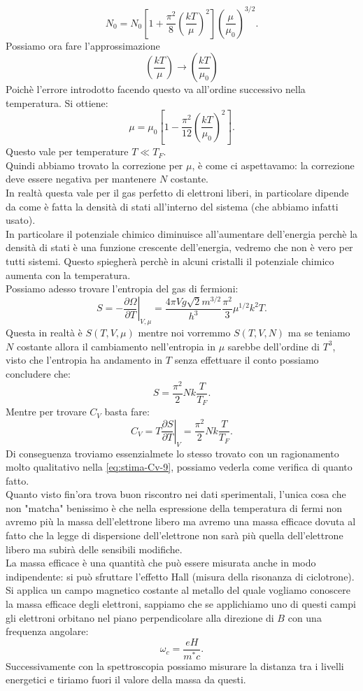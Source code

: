 \[
	N_0 = N_0\left[ 1 + \frac{\pi^2}{8}\left( \frac{kT}{\mu } \right) ^2 \right] \left( \frac{\mu }{\mu_0} \right) ^{3 /2}
.\] 
Possiamo ora fare l'approssimazione 
\[
\left( \frac{kT}{\mu } \right)  \to \left( \frac{kT}{\mu_0} \right) 
\]
Poichè l'errore introdotto facendo questo va all'ordine successivo nella temperatura. Si ottiene:
\[
	\mu = \mu_0\left[ 1- \frac{\pi^2}{12}\left( \frac{kT}{\mu_0} \right)^2 \right] 
.\] 
Questo vale per temperature $T \ll T_{F}$.\\
Quindi abbiamo trovato la correzione per $\mu $, è come ci aspettavamo: la correzione deve essere negativa per mantenere $N$ costante. \\
In realtà questa vale per il gas perfetto di elettroni liberi, in particolare dipende da come è fatta la densità di stati all'interno del sistema (che abbiamo infatti usato).\\
In particolare il potenziale chimico diminuisce all'aumentare dell'energia perchè la densità di stati è una funzione crescente dell'energia, vedremo che non è vero per tutti sistemi. Questo spiegherà perchè in alcuni cristalli il potenziale chimico aumenta con la temperatura.\\
Possiamo adesso trovare l'entropia del gas di fermioni:
\[
	S = - \left.\frac{\partial \Omega }{\partial T} \right|_{V,\mu } = 
		\frac{4\pi V g \sqrt{2} m ^{3 /2}}{h^3} \frac{\pi^2}{3}\mu ^{1 /2} k^2 T
.\] 
Questa in realtà è $S( T, V , \mu ) $ mentre noi vorremmo $S( T,V,N) $ ma se teniamo $N$ costante allora il cambiamento nell'entropia in $\mu $ sarebbe dell'ordine di $T^3$, visto che l'entropia ha andamento in $T$ senza effettuare il conto possiamo concludere che:
\[
	S = \frac{\pi^2}{2}Nk \frac{T}{T_{F}}
.\] 
Mentre per trovare $C_{V}$ basta fare:
\[
	C_{V} = T \left.\frac{\partial S}{\partial T} \right|_{V} = \frac{\pi^2}{2} Nk \frac{T}{T_{F}}
.\] 
Di conseguenza troviamo essenzialmete lo stesso trovato con un ragionamento molto qualitativo nella \ref{eq:stima-Cv-9}, possiamo vederla come verifica di quanto fatto.\\
Quanto visto fin'ora trova buon riscontro nei dati sperimentali, l'unica cosa che non "matcha" benissimo è che nella espressione della temperatura di fermi non avremo più la massa dell'elettrone libero ma avremo una massa efficace dovuta al fatto  che la legge di dispersione dell'elettrone non sarà più quella dell'elettrone libero ma subirà delle sensibili modifiche. \\
La massa efficace è una quantità che può essere misurata anche in modo indipendente: si può sfruttare l'effetto Hall (misura della risonanza di ciclotrone). Si applica un campo magnetico costante al metallo del quale vogliamo conoscere la massa efficace degli elettroni, sappiamo che se applichiamo uno di questi campi gli elettroni orbitano nel piano perpendicolare alla direzione di $B$ con una frequenza angolare:
\[
	\omega_{c}= \frac{eH}{ m ^{*}c}
.\] 
Successivamente con la spettroscopia possiamo misurare la distanza tra i livelli energetici e tiriamo fuori il valore della massa da questi.

